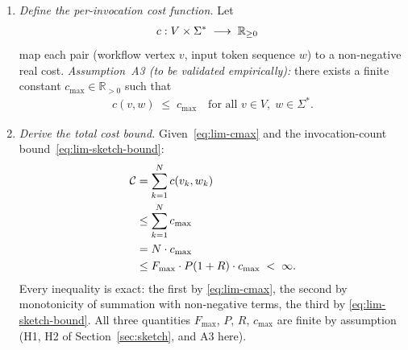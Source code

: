 \documentclass[12pt]{article}
\theoremstyle{definition}
\begin{document}
\begin{enumerate}
    \item \emph{Define the per-invocation cost function.}
          Let
          \begin{align}
              c : V \times \Sigma^{*}
              &\;\longrightarrow\; \mathbb{R}_{\geq 0}
              \notag
          \end{align}
          map each pair (workflow vertex $v$, input token sequence
          $w$) to a non-negative real cost.
          \emph{Assumption~A3 (to be validated empirically):}
          there exists a finite constant $c_{\max} \in \mathbb{R}_{>0}$
          such that
          \begin{align}
              \label{eq:lim-cmax}
              c(v, w) \;\leq\; c_{\max}
              \quad\text{for all } v \in V,\; w \in \Sigma^{*}.
          \end{align}

    \item \emph{Derive the total cost bound.}
          Given~\eqref{eq:lim-cmax} and the invocation-count
          bound~\eqref{eq:lim-sketch-bound}:
          \begin{align}
              \mathcal{C}
              &= \sum_{k=1}^{N} c(v_k, w_k)
              \notag\\
              &\leq \sum_{k=1}^{N} c_{\max}
              \notag\\
              &= N \cdot c_{\max}
              \notag\\
              &\leq F_{\max} \cdot P(1 + R) \cdot c_{\max}
              \;< \;\infty.
              \label{eq:lim-cost-bound}
          \end{align}
          Every inequality is exact: the first by
          \eqref{eq:lim-cmax}, the second by monotonicity of
          summation with non-negative terms, the third by
          \eqref{eq:lim-sketch-bound}.  All three quantities
          $F_{\max}$, $P$, $R$, $c_{\max}$ are finite by
          assumption (H1, H2 of Section~\ref{sec:sketch}, and
          A3 here).


\end{enumerate}
\end{document}
